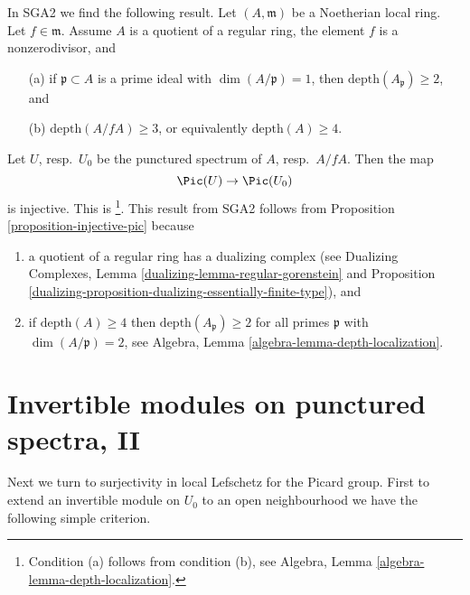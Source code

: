 \begin{remark}
\label{remark-compare-SGA2}
In SGA2 we find the following result. Let $(A, \mathfrak m)$ be a
Noetherian local ring. Let $f \in \mathfrak m$. Assume $A$
is a quotient of a regular ring, the element
$f$ is a nonzerodivisor, and
\begin{enumerate}
\item[(a)] if $\mathfrak p \subset A$ is a prime ideal with
$\dim(A/\mathfrak p) = 1$, then $\text{depth}(A_\mathfrak p) \geq 2$, and
\item[(b)] $\text{depth}(A/fA) \geq 3$, or equivalently
$\text{depth}(A) \geq 4$.
\end{enumerate}
Let $U$, resp.\ $U_0$ be the punctured spectrum of $A$, resp.\ $A/fA$. Then
the map
$$
\Pic(U) \to \Pic(U_0)
$$
is injective. This is \cite[Exposee XI, Lemma 3.16]{SGA2}\footnote{Condition
(a) follows from condition (b), see
Algebra, Lemma \ref{algebra-lemma-depth-localization}.}. This result
from SGA2 follows from Proposition \ref{proposition-injective-pic}
because
\begin{enumerate}
\item a quotient of a regular ring has a dualizing complex (see
Dualizing Complexes, Lemma \ref{dualizing-lemma-regular-gorenstein} and
Proposition \ref{dualizing-proposition-dualizing-essentially-finite-type}), and
\item if $\text{depth}(A) \geq 4$ then $\text{depth}(A_\mathfrak p) \geq 2$
for all primes $\mathfrak p$ with $\dim(A/\mathfrak p) = 2$, see
Algebra, Lemma \ref{algebra-lemma-depth-localization}.
\end{enumerate}
\end{remark}






\section{Invertible modules on punctured spectra, II}
\label{section-local-lefschetz-for-pic-surjective}

\noindent
Next we turn to surjectivity in local Lefschetz for the Picard group.
First to extend an invertible module on $U_0$ to an open neighbourhood
we have the following simple criterion.

